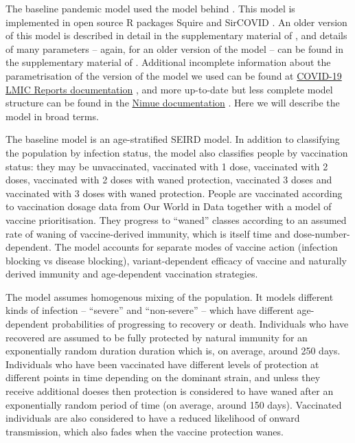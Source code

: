 \documentclass{article}
\begin{document}
The baseline pandemic model used the model behind \citep{watsonoliverj.COVID19LMICReports2022}. This model is implemented in open source R packages Squire \citep[\citet{walkerImpactCOVID19Strategies2020}, \citet{watsonLeveragingCommunityMortality2021}]{hoganWithincountryAgebasedPrioritisation2021} and SirCOVID \citep{baguelinSircovidSIRModel2022}. An older version of this model is described in detail in the supplementary material of \citep{walkerImpactCOVID19Strategies2020}, and details of many parameters -- again, for an older version of the model -- can be found in the supplementary material of \citep{watsonGlobalImpactFirst2022}. Additional incomplete information about the parametrisation of the version of the model we used can be found at \href{https://web.archive.org/web/20221230232942/https://mrc-ide.github.io/global-lmic-reports/parameters.html}{COVID-19 LMIC Reports documentation} \citep{watsonoliverj.COVID19LMICReports2022}, and more up-to-date but less complete model structure can be found in the \href{https://web.archive.org/web/20221230232915/https://mrc-ide.github.io/nimue/index.html}{Nimue documentation} \citep{winskillNimue}. Here we will describe the model in broad terms.

The baseline model is an age-stratified SEIRD model. In addition to classifying the population by infection status, the model also classifies people by vaccination status: they may be unvaccinated, vaccinated with 1 dose, vaccinated with 2 doses, vaccinated with 2 doses with waned protection, vaccinated 3 doses and vaccinated with 3 doses with waned protection. People are vaccinated according to vaccination dosage data from Our World in Data \citep{mathieuCoronavirusPandemicCOVID192020} together with a model of vaccine prioritisation. They progress to ``waned'' classes according to an assumed rate of waning of vaccine-derived immunity, which is itself time and dose-number-dependent. The model accounts for separate modes of vaccine action (infection blocking vs disease blocking), variant-dependent efficacy of vaccine and naturally derived immunity and age-dependent vaccination strategies.

The model assumes homogenous mixing of the population. It models different kinds of infection -- ``severe'' and ``non-severe'' -- which have different age-dependent probabilities of progressing to recovery or death. Individuals who have recovered are assumed to be fully protected by natural immunity for an exponentially random duration duration which is, on average, around 250 days. Individuals who have been vaccinated have different levels of protection at different points in time depending on the dominant strain, and unless they receive additional doeses then protection is considered to have waned after an exponentially random period of time (on average, around 150 days). Vaccinated individuals are also considered to have a reduced likelihood of onward transmission, which also fades when the vaccine protection wanes.
\end{document}

